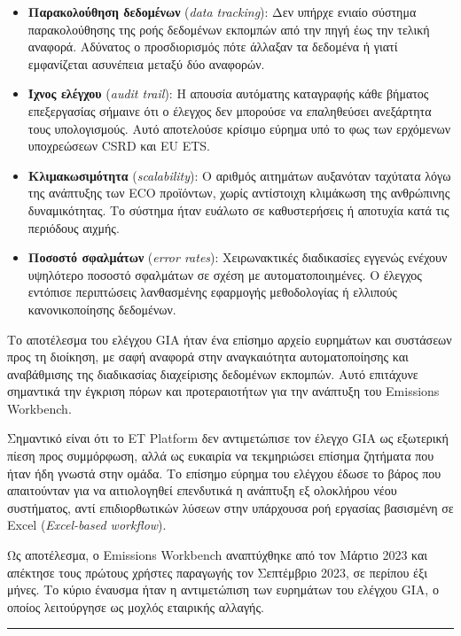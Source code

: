 \documentclass[11pt,a4paper,greek,twoside]{template-xe}
\providecommand{\tightlist}{\setlength{\itemsep}{0pt}\setlength{\parskip}{0pt}}
\begin{document}
\begin{itemize}
\tightlist
\item
  \textbf{Παρακολούθηση δεδομένων} (\emph{data tracking}): Δεν υπήρχε
  ενιαίο σύστημα παρακολούθησης της ροής δεδομένων εκπομπών από την πηγή
  έως την τελική αναφορά. Αδύνατος ο προσδιορισμός πότε άλλαξαν τα
  δεδομένα ή γιατί εμφανίζεται ασυνέπεια μεταξύ δύο αναφορών.
\item
  \textbf{Ίχνος ελέγχου} (\emph{audit trail}): Η απουσία αυτόματης
  καταγραφής κάθε βήματος επεξεργασίας σήμαινε ότι ο έλεγχος δεν
  μπορούσε να επαληθεύσει ανεξάρτητα τους υπολογισμούς. Αυτό αποτελούσε
  κρίσιμο εύρημα υπό το φως των ερχόμενων υποχρεώσεων CSRD και EU ETS.
\item
  \textbf{Κλιμακωσιμότητα} (\emph{scalability}): Ο αριθμός αιτημάτων
  αυξανόταν ταχύτατα λόγω της ανάπτυξης των ECO προϊόντων, χωρίς
  αντίστοιχη κλιμάκωση της ανθρώπινης δυναμικότητας. Το σύστημα ήταν
  ευάλωτο σε καθυστερήσεις ή αποτυχία κατά τις περιόδους αιχμής.
\item
  \textbf{Ποσοστό σφαλμάτων} (\emph{error rates}): Χειρωνακτικές
  διαδικασίες εγγενώς ενέχουν υψηλότερο ποσοστό σφαλμάτων σε σχέση με
  αυτοματοποιημένες. Ο έλεγχος εντόπισε περιπτώσεις λανθασμένης
  εφαρμογής μεθοδολογίας ή ελλιπούς κανονικοποίησης δεδομένων.
\end{itemize}

Το αποτέλεσμα του ελέγχου GIA ήταν ένα επίσημο αρχείο ευρημάτων και
συστάσεων προς τη διοίκηση, με σαφή αναφορά στην αναγκαιότητα
αυτοματοποίησης και αναβάθμισης της διαδικασίας διαχείρισης δεδομένων
εκπομπών. Αυτό επιτάχυνε σημαντικά την έγκριση πόρων και προτεραιοτήτων
για την ανάπτυξη του Emissions Workbench.

Σημαντικό είναι ότι το ET Platform δεν αντιμετώπισε τον έλεγχο GIA ως
εξωτερική πίεση προς συμμόρφωση, αλλά ως ευκαιρία να τεκμηριώσει επίσημα
ζητήματα που ήταν ήδη γνωστά στην ομάδα. Το επίσημο εύρημα του ελέγχου
έδωσε το βάρος που απαιτούνταν για να αιτιολογηθεί επενδυτικά η ανάπτυξη
εξ ολοκλήρου νέου συστήματος, αντί επιδιορθωτικών λύσεων στην υπάρχουσα
ροή εργασίας βασισμένη σε Excel (\emph{Excel-based workflow}).

Ως αποτέλεσμα, ο Emissions Workbench αναπτύχθηκε από τον Μάρτιο 2023 και
απέκτησε τους πρώτους χρήστες παραγωγής τον Σεπτέμβριο 2023, σε περίπου
έξι μήνες. Το κύριο έναυσμα ήταν η αντιμετώπιση των ευρημάτων του
ελέγχου GIA, ο οποίος λειτούργησε ως μοχλός εταιρικής αλλαγής.

\begin{center}\rule{0.5\linewidth}{0.5pt}\end{center}
\end{document}
